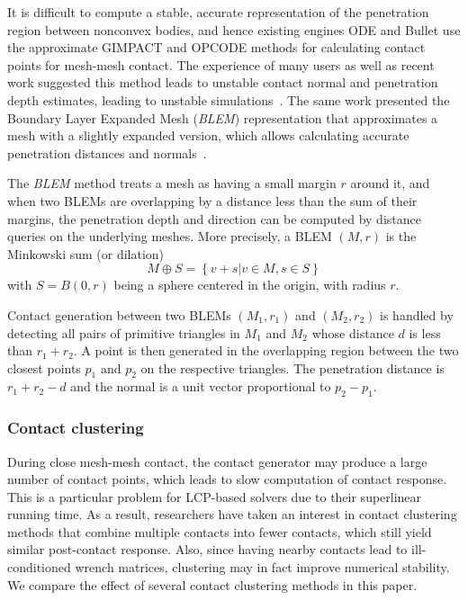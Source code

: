 It is difficult to compute a stable, accurate representation of the penetration region between nonconvex bodies, and hence existing engines ODE and Bullet use the approximate GIMPACT and OPCODE methods for calculating contact points for mesh-mesh contact. The experience of many users as well as recent work suggested this method leads to unstable contact normal and penetration depth estimates, leading to unstable simulations~\cite{Hauser13BLEM}.  The same work presented the Boundary Layer Expanded Mesh (\emph{BLEM}) representation that approximates a mesh with a slightly expanded version, which allows calculating accurate penetration distances and normals~\cite{Hauser13BLEM}. 

The \emph{BLEM} method treats a mesh as having a small margin $r$ around it, and when two BLEMs are overlapping by a distance less than the sum of their margins, the penetration depth and direction can be computed by distance queries on the underlying meshes.  More precisely, a BLEM $(M,r)$ is the Minkowski sum (or dilation) 
\begin{equation}
M \oplus S=\left\{v+s|v \in M,s \in S\right\}
\end{equation}
with $S=B(0,r)$ being a sphere centered in the origin, with radius $r$.

Contact generation between two BLEMs $(M_1,r_1)$ and $(M_2,r_2)$ is handled by detecting all pairs of primitive triangles in $M_1$ and $M_2$ whose distance $d$ is less than $r_1+r_2$.  A point is then generated in the overlapping region between the two closest points $p_1$ and $p_2$ on the respective triangles.  The penetration distance is $r_1+r_2-d$ and the normal is a unit vector proportional to $p_2-p_1$.


\subsubsection{Contact clustering}
During close mesh-mesh contact, the contact generator may produce a large number of contact points, which leads to slow computation of contact response. This is a particular problem for LCP-based solvers due to their superlinear running time.  As a result, researchers have taken an interest in contact clustering methods that combine multiple contacts into fewer contacts, which still yield similar post-contact response.  Also, since having nearby contacts lead to ill-conditioned wrench matrices, clustering may in fact improve numerical stability.  We compare the effect of several contact clustering methods in this paper.

